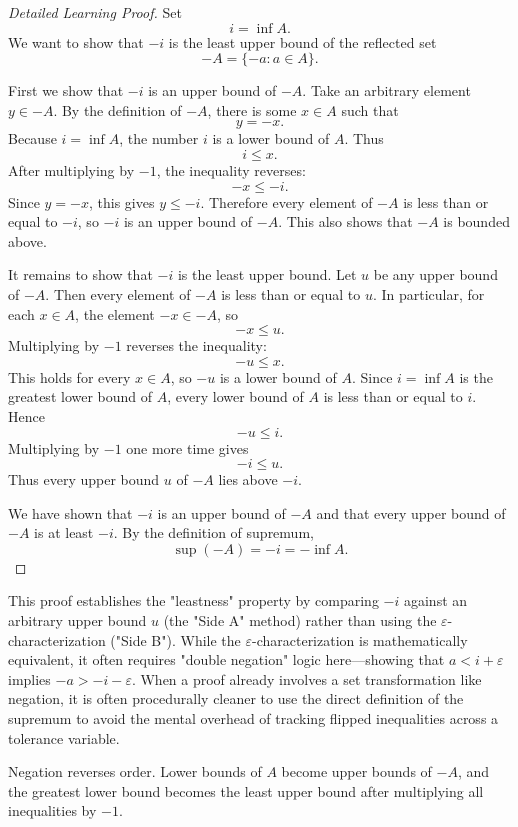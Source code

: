 \begin{proof}[Detailed Learning Proof]
\LRAProofBodyStart
Set
\[
i=\inf A.
\]
We want to show that \(-i\) is the least upper bound of the reflected set
\[
-A=\{-a:a\in A\}.
\]

First we show that \(-i\) is an upper bound of \(-A\). Take an arbitrary
element \(y\in -A\). By the definition of \(-A\), there is some \(x\in A\)
such that
\[
y=-x.
\]
Because \(i=\inf A\), the number \(i\) is a lower bound of \(A\). Thus
\[
i\le x.
\]
After multiplying by \(-1\), the inequality reverses:
\[
-x\le -i.
\]
Since \(y=-x\), this gives \(y\le -i\). Therefore every element of \(-A\) is
less than or equal to \(-i\), so \(-i\) is an upper bound of \(-A\). This also
shows that \(-A\) is bounded above.

It remains to show that \(-i\) is the least upper bound. Let \(u\) be any
upper bound of \(-A\). Then every element of \(-A\) is less than or equal to
\(u\). In particular, for each \(x\in A\), the element \(-x\in -A\), so
\[
-x\le u.
\]
Multiplying by \(-1\) reverses the inequality:
\[
-u\le x.
\]
This holds for every \(x\in A\), so \(-u\) is a lower bound of \(A\). Since
\(i=\inf A\) is the greatest lower bound of \(A\), every lower bound of \(A\)
is less than or equal to \(i\). Hence
\[
-u\le i.
\]
Multiplying by \(-1\) one more time gives
\[
-i\le u.
\]
Thus every upper bound \(u\) of \(-A\) lies above \(-i\).

We have shown that \(-i\) is an upper bound of \(-A\) and that every upper
bound of \(-A\) is at least \(-i\). By the definition of supremum,
\[
\sup(-A)=-i=-\inf A.
\]
\end{proof}

\begin{remark*}
This proof establishes the "leastness" property by comparing $-i$ against an arbitrary upper bound $u$ (the "Side A" method) rather than using the $\varepsilon$-characterization ("Side B"). While the $\varepsilon$-characterization is mathematically equivalent, it often requires "double negation" logic here---showing that $a < i + \varepsilon$ implies $-a > -i - \varepsilon$. When a proof already involves a set transformation like negation, it is often procedurally cleaner to use the direct definition of the supremum to avoid the mental overhead of tracking flipped inequalities across a tolerance variable.
\end{remark*}

\begin{remark*}
Negation reverses order. Lower bounds of \(A\) become upper bounds of \(-A\),
and the greatest lower bound becomes the least upper bound after multiplying
all inequalities by \(-1\).
\end{remark*}

